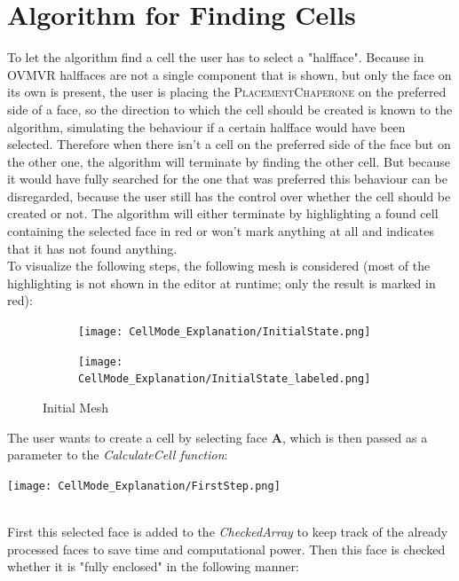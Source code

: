 \documentclass{report}
\begin{document}
	\section{Algorithm for Finding Cells} \label{CellMode}
	\startsection
		To let the algorithm find a cell the user has to select a "halfface". Because in OVMVR halffaces are not a single component that is shown, but only the face on its own is present, the user is placing the \textsc{PlacementChaperone} on the preferred side of a face, so the direction to which the cell should be created is known to the algorithm, simulating the behaviour if a certain halfface would have been selected. Therefore when there isn't a cell on the preferred side of the face but on the other one, the algorithm will terminate by finding the other cell. But because it would have fully searched for the one that was preferred this behaviour can be disregarded, because the user still has the control over whether the cell should be created or not. The algorithm will either terminate by highlighting a found cell containing the selected face in red or won't mark anything at all and indicates that it has not found anything. \\
		To visualize the following steps, the following mesh is considered (most of the highlighting is not shown in the editor at runtime; only the result is marked in red):
		\begin{figure}[H]
			\centering
			\begin{subfigure}[H]{2.5in}
				\centering
				\texttt{[image: CellMode\_Explanation/InitialState.png]}
				\label{pic:pic5.1.a}
			\end{subfigure}
			\quad
			\begin{subfigure}[H]{2.5in}
				\centering
				\texttt{[image: CellMode\_Explanation/InitialState\_labeled.png]}
				\label{pic:pic5.1.b}
			\end{subfigure}
			\caption{Initial Mesh}
			\label{pic:pic5.1}
		\end{figure}
		\noindent The user wants to create a cell by selecting face \textbf{A}, which is then passed as a parameter to the \textit{CalculateCell function}: \\
		\begin{center}
			\texttt{[image: CellMode\_Explanation/FirstStep.png]}
			\label{pic:pic5.2}
		\end{center}
		\hfill \\
		First this selected face is added to the \textit{CheckedArray} to keep track of the already processed faces to save time and computational power. Then this face is checked whether it is "fully enclosed" in the following manner:
\end{document}
